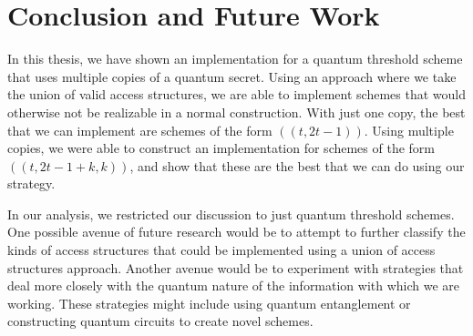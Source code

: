 \chapter{Conclusion and Future Work}
\label{conclusion}

In this thesis, we have shown an implementation for a quantum threshold scheme that uses multiple copies of a quantum secret. Using an approach where we take the union of valid access structures, we are able to implement schemes that would otherwise not be realizable in a normal construction. With just one copy, the best that we can implement are schemes of the form $((t,2t-1))$. Using multiple copies, we were able to construct an implementation for schemes of the form $((t,2t-1+k,k))$, and show that these are the best that we can do using our strategy.

In our analysis, we restricted our discussion to just quantum threshold schemes. One possible avenue of future research would be to attempt to further classify the kinds of access structures that could be implemented using a union of access structures approach. Another avenue would be to experiment with strategies that deal more closely with the quantum nature of the information with which we are working. These strategies might include using quantum entanglement or constructing quantum circuits to create novel schemes.